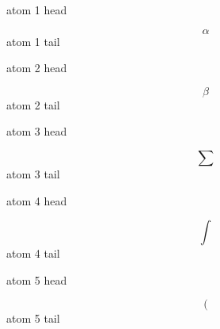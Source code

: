\documentclass[12pt]{article}
\begin{document}
\noindent atom 1 head\par
\[ \alpha \]
\noindent atom 1 tail\par
\noindent atom 2 head\par
\[ \beta \]
\noindent atom 2 tail\par
\noindent atom 3 head\par
\[ \sum \]
\noindent atom 3 tail\par
\noindent atom 4 head\par
\[ \int \]
\noindent atom 4 tail\par
\noindent atom 5 head\par
\[ ( \]
\noindent atom 5 tail\par
\end{document}
